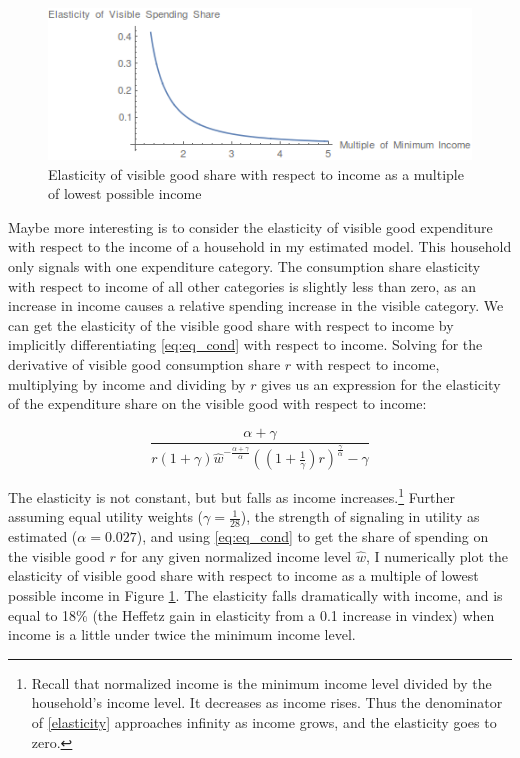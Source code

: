 \documentclass[11pt]{article}
\begin{document}
\begin{CJK}{UTF8}{gbsn}
\begin{figure}[ht]
    \centering
	\includegraphics[scale=.8]{pics/elasticity.png}
    \caption{Elasticity of visible good share with respect to income as a multiple of lowest possible income}
    \label{fig:elasticity}
\end{figure}

Maybe more interesting is to consider the elasticity of visible good expenditure with respect to the income of a household in my estimated model.  This household only signals with one expenditure category.  The consumption share elasticity with respect to income of all other categories is slightly less than zero, as an increase in income causes a relative spending increase in the visible category.  We can get the elasticity of the visible good share with respect to income by implicitly differentiating \eqref{eq:eq_cond} with respect to income.  Solving for the derivative of visible good consumption share $r$ with respect to income, multiplying by income and dividing by $r$ gives us an expression for the elasticity of the expenditure share on the visible good with respect to income:  

\begin{equation}
    \label{elasticity}
    \frac{\alpha + \gamma}{r \left(1 + \gamma\right)\hat{w}^{-\frac{\alpha + \gamma}{\alpha}}\left(\left(1 + \frac{1}{\gamma}\right) r\right)^{\frac{\gamma}{\alpha}} - \gamma}
\end{equation}

The elasticity is not constant, but but falls as income increases.\footnote{Recall that normalized income is the minimum income level divided by the household's income level.  It decreases as income rises.  Thus the denominator of \eqref{elasticity} approaches infinity as income grows, and the elasticity goes to zero.}  Further assuming equal utility weights ($\gamma = \frac{1}{28}$), the strength of signaling in utility as estimated ($\alpha = 0.027$), and using \eqref{eq:eq_cond} to get the share of spending on the visible good $r$ for any given normalized income level $\hat{w}$, I numerically plot the elasticity of visible good share with respect to income as a multiple of lowest possible income in Figure \ref{fig:elasticity}.  The elasticity falls dramatically with income, and is equal to 18\% (the Heffetz gain in elasticity from a 0.1 increase in vindex) when income is a little under twice the minimum income level.


\end{CJK}
\end{document}
